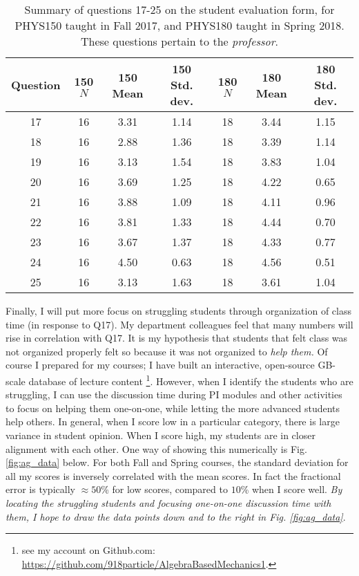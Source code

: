 \documentclass[../../main.tex]{subfiles}
\begin{document}
\begin{table}
\centering
\begin{tabular}{| c | c | c | c | c | c | c |}
\hline \hline
Question & 150 $N$ & 150 Mean & 150 Std. dev. & 180 $N$ & 180 Mean & 180 Std. dev. \\ \hline
17 & 16 & 3.31 & 1.14 & 18 & 3.44 & 1.15 \\ \hline
18 & 16 & 2.88 & 1.36 & 18 & 3.39 & 1.14 \\ \hline
19 & 16 & 3.13 & 1.54 & 18 & 3.83 & 1.04 \\ \hline
20 & 16 & 3.69 & 1.25 & 18 & 4.22 & 0.65 \\ \hline
21 & 16 & 3.88 & 1.09 & 18 & 4.11 & 0.96 \\ \hline
22 & 16 & 3.81 & 1.33 & 18 & 4.44 & 0.70 \\ \hline
23 & 16 & 3.67 & 1.37 & 18 & 4.33 & 0.77 \\ \hline
24 & 16 & 4.50 & 0.63 & 18 & 4.56 & 0.51 \\ \hline
25 & 16 & 3.13 & 1.63 & 18 & 3.61 & 1.04 \\ \hline
\hline
\end{tabular}
\caption{\label{tab:courses:intro_eval_4} Summary of questions 17-25 on the student evaluation form, for PHYS150 taught in Fall 2017, and PHYS180 taught in Spring 2018.  These questions pertain to the \textit{professor}.}
\end{table}

Finally, I will put more focus on struggling students through organization of class time (in response to Q17).  My department colleagues feel that many numbers will rise in correlation with Q17.  It is my hypothesis that students that felt class was not organized properly felt so because it was not organized to \textit{help them.}  Of course I prepared for my courses; I have built an interactive, open-source GB-scale database of lecture content \footnote{see my account on Github.com: \url{https://github.com/918particle/AlgebraBasedMechanics1}.}.  However, when I identify the students who are struggling, I can use the discussion time during PI modules and other activities to focus on helping them one-on-one, while letting the more advanced students help others.  In general, when I score low in a particular category, there is large variance in student opinion.  When I score high, my students are in closer alignment with each other.  One way of showing this numerically is Fig. \ref{fig:ag_data} below.  For both Fall and Spring courses, the standard deviation for all my scores is inversely correlated with the mean scores.  In fact the fractional error is typically $\approx 50$\% for low scores, compared to $10$\% when I score well.  \textit{By locating the struggling students and focusing one-on-one discussion time with them, I hope to draw the data points down and to the right in Fig. \ref{fig:ag_data}}.
\end{document}
